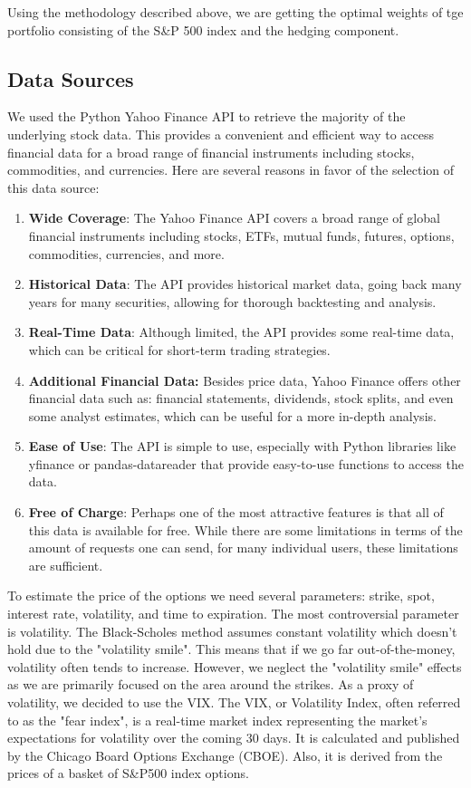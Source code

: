 \documentclass[12pt]{article}
\begin{document}
{{\qquad Using the methodology described above, we are getting the optimal weights of tge portfolio consisting of the S\&P 500 index and the hedging component.

\subsection{Data Sources}

\qquad We used the Python Yahoo Finance API to retrieve the majority of the underlying stock data. This provides a convenient and efficient way to access financial data for a broad range of financial instruments including stocks, commodities, and currencies. Here are several reasons in favor of the selection of this data source:

\begin{enumerate}
\item \textbf{Wide Coverage}: The Yahoo Finance API covers a broad range of global financial instruments including stocks, ETFs, mutual funds, futures, options, commodities, currencies, and more.
\item \textbf{Historical Data}: The API provides historical market data, going back many years for many securities, allowing for thorough backtesting and analysis.
\item \textbf{Real-Time Data}: Although limited, the API provides some real-time data, which can be critical for short-term trading strategies.
\item \textbf{Additional Financial Data:} Besides price data, Yahoo Finance offers other financial data such as: financial statements, dividends, stock splits, and even some analyst estimates, which can be useful for a more in-depth analysis.
\item \textbf{Ease of Use}: The API is simple to use, especially with Python libraries like yfinance or pandas-datareader that provide easy-to-use functions to access the data.
\item \textbf{Free of Charge}: Perhaps one of the most attractive features is that all of this data is available for free. While there are some limitations in terms of the amount of requests one can send, for many individual users, these limitations are sufficient.
\end{enumerate}

\qquad To estimate the price of the options we need several parameters: strike, spot, interest rate, volatility, and time to expiration. The most controversial parameter is volatility. The Black-Scholes method assumes constant volatility which doesn't hold due to the "volatility smile". This means that if we go far out-of-the-money, volatility often tends to increase. However, we neglect the "volatility smile" effects as we are primarily focused on the area around the strikes. As a proxy of volatility, we decided to use the VIX.
\qquad The VIX, or Volatility Index, often referred to as the "fear index", is a real-time market index representing the market's expectations for volatility over the coming 30 days. It is calculated and published by the Chicago Board Options Exchange (CBOE). Also, it is derived from the prices of a basket of S\&P500 index options.

}}
\end{document}
